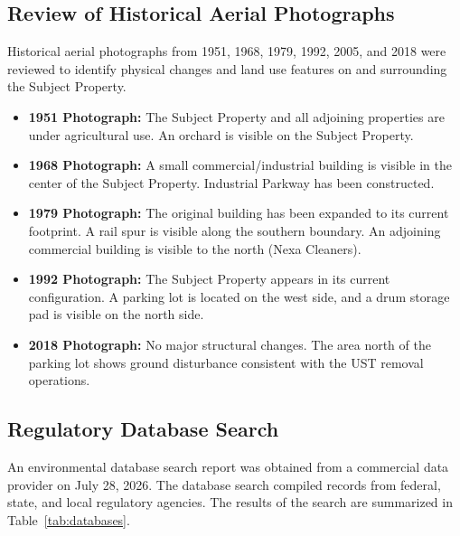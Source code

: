 \subsection{Review of Historical Aerial Photographs}
Historical aerial photographs from 1951, 1968, 1979, 1992, 2005, and 2018 were reviewed to identify physical changes and land use features on and surrounding the Subject Property.
\begin{itemize}
  \item \textbf{1951 Photograph:} The Subject Property and all adjoining properties are under agricultural use. An orchard is visible on the Subject Property.
  \item \textbf{1968 Photograph:} A small commercial/industrial building is visible in the center of the Subject Property. Industrial Parkway has been constructed.
  \item \textbf{1979 Photograph:} The original building has been expanded to its current footprint. A rail spur is visible along the southern boundary. An adjoining commercial building is visible to the north (Nexa Cleaners).
  \item \textbf{1992 Photograph:} The Subject Property appears in its current configuration. A parking lot is located on the west side, and a drum storage pad is visible on the north side.
  \item \textbf{2018 Photograph:} No major structural changes. The area north of the parking lot shows ground disturbance consistent with the UST removal operations.
\end{itemize}

\subsection{Regulatory Database Search}
An environmental database search report was obtained from a commercial data provider on July 28, 2026. The database search compiled records from federal, state, and local regulatory agencies. The results of the search are summarized in Table~\ref{tab:databases}.

